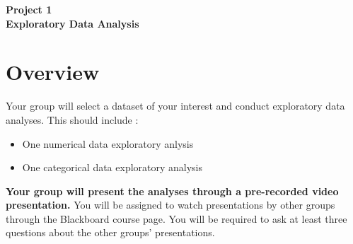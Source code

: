 \documentclass[12pt]{article}
\begin{document}
\begin{center}
\textbf{\Large Project 1 \\ Exploratory Data Analysis } 
\end{center}


\section*{Overview}
Your group will select a dataset of your interest and conduct exploratory data analyses.
This should include :
\begin{itemize}
    \item One numerical data exploratory anlysis
    \item One categorical data exploratory analysis 
\end{itemize} 
\textbf{Your group will present the analyses through a pre-recorded video presentation.}
You will be assigned to watch presentations by other groups through the Blackboard course page. 
You will be required to ask at least three questions about the other groups' presentations. 
\end{document}

